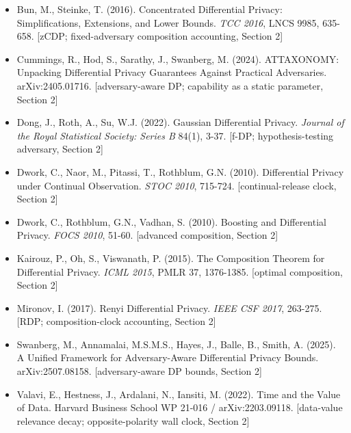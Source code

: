 \documentclass[
  11pt,
]{article}
\providecommand{\tightlist}{%
  \setlength{\itemsep}{0pt}\setlength{\parskip}{0pt}}
\begin{document}
\begin{itemize}
\tightlist
\item
  Bun, M., Steinke, T. (2016). Concentrated Differential Privacy:
  Simplifications, Extensions, and Lower Bounds. \emph{TCC 2016}, LNCS
  9985, 635-658. {[}zCDP; fixed-adversary composition accounting,
  Section 2{]}
\item
  Cummings, R., Hod, S., Sarathy, J., Swanberg, M. (2024). ATTAXONOMY:
  Unpacking Differential Privacy Guarantees Against Practical
  Adversaries. arXiv:2405.01716. {[}adversary-aware DP; capability as a
  static parameter, Section 2{]}
\item
  Dong, J., Roth, A., Su, W.J. (2022). Gaussian Differential Privacy.
  \emph{Journal of the Royal Statistical Society: Series B} 84(1), 3-37.
  {[}f-DP; hypothesis-testing adversary, Section 2{]}
\item
  Dwork, C., Naor, M., Pitassi, T., Rothblum, G.N. (2010). Differential
  Privacy under Continual Observation. \emph{STOC 2010}, 715-724.
  {[}continual-release clock, Section 2{]}
\item
  Dwork, C., Rothblum, G.N., Vadhan, S. (2010). Boosting and
  Differential Privacy. \emph{FOCS 2010}, 51-60. {[}advanced
  composition, Section 2{]}
\item
  Kairouz, P., Oh, S., Viswanath, P. (2015). The Composition Theorem for
  Differential Privacy. \emph{ICML 2015}, PMLR 37, 1376-1385. {[}optimal
  composition, Section 2{]}
\item
  Mironov, I. (2017). Renyi Differential Privacy. \emph{IEEE CSF 2017},
  263-275. {[}RDP; composition-clock accounting, Section 2{]}
\item
  Swanberg, M., Annamalai, M.S.M.S., Hayes, J., Balle, B., Smith, A.
  (2025). A Unified Framework for Adversary-Aware Differential Privacy
  Bounds. arXiv:2507.08158. {[}adversary-aware DP bounds, Section 2{]}
\item
  Valavi, E., Hestness, J., Ardalani, N., Iansiti, M. (2022). Time and
  the Value of Data. Harvard Business School WP 21-016 /
  arXiv:2203.09118. {[}data-value relevance decay; opposite-polarity
  wall clock, Section 2{]}
\end{itemize}
\end{document}
